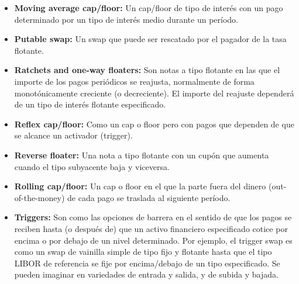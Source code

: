 \begin{itemize}
    \item \textbf{Moving average cap/floor:} Un cap/floor de tipo de interés con un pago determinado por un tipo de interés medio durante un período.
    \item \textbf{Putable swap:} Un swap que puede ser rescatado por el pagador de la tasa flotante.
    \item \textbf{Ratchets and one-way floaters:} Son notas a tipo flotante en las que el importe de los pagos periódicos se reajusta, normalmente de forma monotónicamente creciente (o decreciente). El importe del reajuste dependerá de un tipo de interés flotante especificado.
    \item \textbf{Reflex cap/floor:} Como un cap o floor pero con pagos que dependen de que se alcance un activador (trigger).
    \item \textbf{Reverse floater:} Una nota a tipo flotante con un cupón que aumenta cuando el tipo subyacente baja y viceversa.
    \item \textbf{Rolling cap/floor:} Un cap o floor en el que la parte fuera del dinero (out-of-the-money) de cada pago se traslada al siguiente período.
    \item \textbf{Triggers:} Son como las opciones de barrera en el sentido de que los pagos se reciben hasta (o después de) que un activo financiero especificado cotice por encima o por debajo de un nivel determinado. Por ejemplo, el trigger swap es como un swap de vainilla simple de tipo fijo y flotante hasta que el tipo LIBOR de referencia se fije por encima/debajo de un tipo especificado. Se pueden imaginar en variedades de entrada y salida, y de subida y bajada.
\end{itemize}




